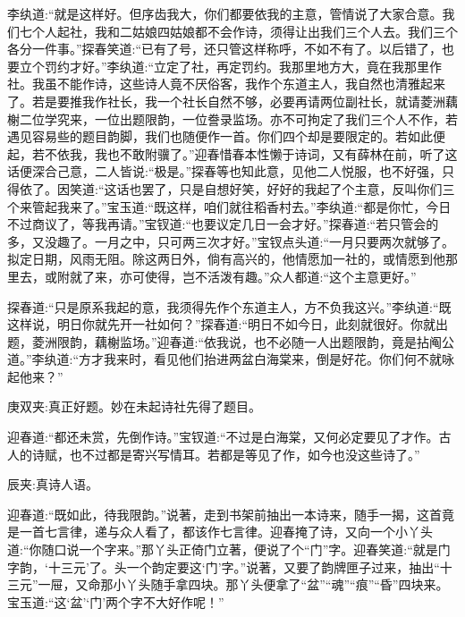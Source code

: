 \begin{parag}
    李纨道:“就是这样好。但序齿我大，你们都要依我的主意，管情说了大家合意。我们七个人起社，我和二姑娘四姑娘都不会作诗，须得让出我们三个人去。我们三个各分一件事。”探春笑道:“已有了号，还只管这样称呼，不如不有了。以后错了，也要立个罚约才好。”李纨道:“立定了社，再定罚约。我那里地方大，竟在我那里作社。我虽不能作诗，这些诗人竟不厌俗客，我作个东道主人，我自然也清雅起来了。若是要推我作社长，我一个社长自然不够，必要再请两位副社长，就请菱洲藕榭二位学究来，一位出题限韵，一位誊录监场。亦不可拘定了我们三个人不作，若遇见容易些的题目韵脚，我们也随便作一首。你们四个却是要限定的。若如此便起，若不依我，我也不敢附骥了。”迎春惜春本性懒于诗词，又有薛林在前，听了这话便深合己意，二人皆说:“极是。”探春等也知此意，见他二人悦服，也不好强，只得依了。因笑道:“这话也罢了，只是自想好笑，好好的我起了个主意，反叫你们三个来管起我来了。”宝玉道:“既这样，咱们就往稻香村去。”李纨道:“都是你忙，今日不过商议了，等我再请。”宝钗道:“也要议定几日一会才好。”探春道:“若只管会的多，又没趣了。一月之中，只可两三次才好。”宝钗点头道:“一月只要两次就够了。拟定日期，风雨无阻。除这两日外，倘有高兴的，他情愿加一社的，或情愿到他那里去，或附就了来，亦可使得，岂不活泼有趣。”众人都道:“这个主意更好。”
\end{parag}


\begin{parag}
    探春道:“只是原系我起的意，我须得先作个东道主人，方不负我这兴。”李纨道:“既这样说，明日你就先开一社如何？”探春道:“明日不如今日，此刻就很好。你就出题，菱洲限韵，藕榭监场。”迎春道:“依我说，也不必随一人出题限韵，竟是拈阄公道。”李纨道:“方才我来时，看见他们抬进两盆白海棠来，倒是好花。你们何不就咏起他来？”\begin{note}庚双夹:真正好题。妙在未起诗社先得了题目。\end{note}迎春道:“都还未赏，先倒作诗。”宝钗道:“不过是白海棠，又何必定要见了才作。古人的诗赋，也不过都是寄兴写情耳。若都是等见了作，如今也没这些诗了。”\begin{note}辰夹:真诗人语。\end{note}迎春道:“既如此，待我限韵。”说著，走到书架前抽出一本诗来，随手一揭，这首竟是一首七言律，递与众人看了，都该作七言律。迎春掩了诗，又向一个小丫头道:“你随口说一个字来。”那丫头正倚门立著，便说了个“门”字。迎春笑道:“就是门字韵，‘十三元’了。头一个韵定要这‘门’字。”说著，又要了韵牌匣子过来，抽出“十三元”一屉，又命那小丫头随手拿四块。那丫头便拿了“盆”“魂”“痕”“昏”四块来。宝玉道:“这‘盆’‘门’两个字不大好作呢！”
\end{parag}


